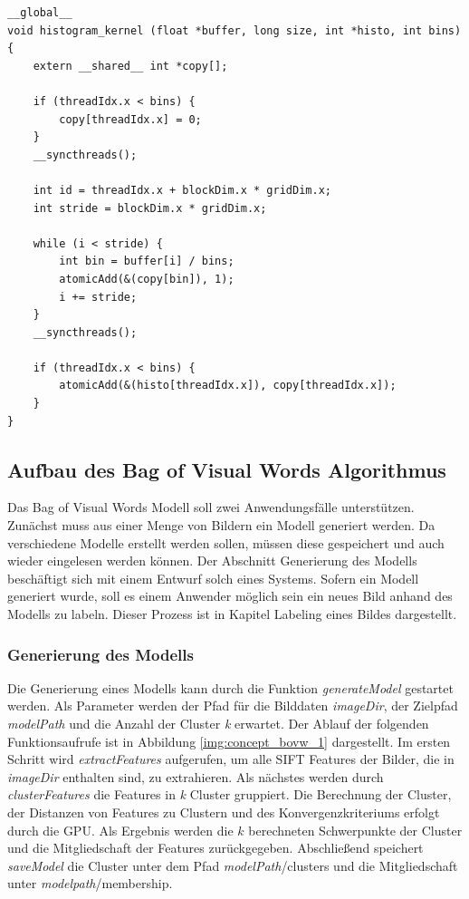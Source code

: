 \lstset{language=C}
\begin{lstlisting}
__global__
void histogram_kernel (float *buffer, long size, int *histo, int bins) {
	extern __shared__ int *copy[];
	
	if (threadIdx.x < bins) {
		copy[threadIdx.x] = 0;		
	}
	__syncthreads();

	int id = threadIdx.x + blockDim.x * gridDim.x;
	int stride = blockDim.x * gridDim.x;
	
	while (i < stride) {
		int bin = buffer[i] / bins; 
		atomicAdd(&(copy[bin]), 1);
		i += stride;	
	}
	__syncthreads();
	
	if (threadIdx.x < bins) {
		atomicAdd(&(histo[threadIdx.x]), copy[threadIdx.x]);		
	}
}
\end{lstlisting} 

\subsection{Aufbau des Bag of Visual Words Algorithmus}

Das Bag of Visual Words Modell soll zwei Anwendungsfälle unterstützen. Zunächst muss aus einer Menge von Bildern ein Modell generiert werden. Da verschiedene Modelle erstellt werden sollen, müssen diese gespeichert und auch wieder eingelesen werden können. Der Abschnitt Generierung des Modells beschäftigt sich mit einem Entwurf solch eines Systems. Sofern ein Modell generiert wurde, soll es einem Anwender möglich sein ein neues Bild anhand des Modells zu labeln. Dieser Prozess ist in Kapitel Labeling eines Bildes dargestellt.

\subsubsection{Generierung des Modells}

Die Generierung eines Modells kann durch die Funktion \textit{generateModel} gestartet werden. Als Parameter werden der Pfad für die Bilddaten \textit{imageDir}, der Zielpfad \textit{modelPath} und die Anzahl der Cluster \textit{k} erwartet. Der Ablauf der folgenden Funktionsaufrufe ist in Abbildung \ref{img:concept_bovw_1} dargestellt. Im ersten Schritt wird \textit{extractFeatures} aufgerufen, um alle SIFT Features der Bilder, die in \textit{imageDir} enthalten sind, zu extrahieren. Als nächstes werden durch \textit{clusterFeatures} die Features in \textit{k} Cluster gruppiert. Die Berechnung der Cluster, der Distanzen von Features zu Clustern und des Konvergenzkriteriums erfolgt durch die GPU. Als Ergebnis werden die $k$ berechneten Schwerpunkte der Cluster und die Mitgliedschaft der Features zurückgegeben. Abschließend speichert \textit{saveModel} die Cluster unter dem Pfad  \textit{modelPath}/clusters und die Mitgliedschaft unter \textit{modelpath}/membership. 

